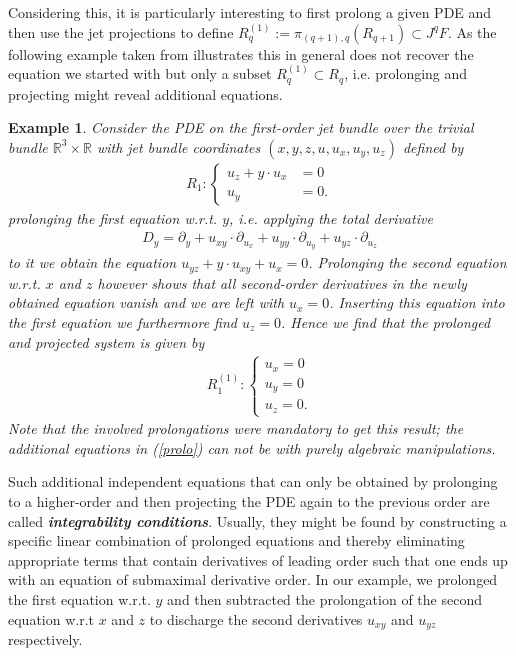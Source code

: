 \documentclass[a4paper,12pt, DIV=14, BCOR=5mm, twoside, headsepline, numbers=noenddot]{scrbook}
\newtheorem{example}{Example}[chapter]
\begin{document}
Considering this, it is particularly interesting to first prolong a given PDE and then use the jet projections to define $R_q^{(1)} := \pi_{(q+1),q}\left ( R_{q+1} \right ) \subset J^qF $. As the following example taken from \cite{seiler1994analysis} illustrates this in general does not recover the equation we started with but only a subset $R_q^{(1)} \subset R_q$, i.e. prolonging and projecting might reveal additional equations.
\begin{example}
Consider the PDE on the first-order jet bundle over the trivial bundle $\mathbb{R}^3 \times \mathbb{R}$ with jet bundle  coordinates $(x,y,z,u,u_x,u_y,u_z)$ defined by 
\begin{align}
    R_1 : \begin{cases} u_z + y \cdot u_x &= 0 \\
                        u_y &= 0.
            \end{cases}
\end{align}
prolonging the first equation w.r.t. $y$, i.e. applying the total derivative 
\begin{align}
D_y = \partial_y + u_{xy} \cdot \partial_{u_x} + u_{yy} \cdot \partial_{u_y} + u_{yz} \cdot \partial_{u_z}
\end{align}
to it we obtain the equation $u_{yz} + y \cdot u_{xy} + u_x =0$. Prolonging the second equation w.r.t. $x$ and $z$ however shows that all second-order derivatives in the newly obtained equation vanish and we are left with $u_x = 0$. Inserting this equation into the first equation we furthermore find $u_z = 0$. Hence we find that the prolonged and projected system is given by 
\begin{align}\label{prolo}
    R_1^{(1)} : \begin{cases} u_x = 0 \\
                        u_y = 0\\
                        u_z = 0 .
            \end{cases}
\end{align}
Note that the involved prolongations were mandatory to get this result; the additional equations in (\ref{prolo})  can not be with purely algebraic manipulations. 
\end{example}
Such additional independent equations that can only be obtained by prolonging to a higher-order and then projecting the PDE again to the previous order are called \textit{\textbf{integrability conditions}}. 
Usually, they might be found by constructing a specific linear combination of prolonged equations and thereby eliminating appropriate terms that contain derivatives of leading order such that one ends up with an equation of submaximal derivative order. In our example, we prolonged the first equation w.r.t. $y$ and then subtracted the prolongation of the second equation w.r.t $x$ and $z$ to discharge the second derivatives $u_{xy}$ and $u_{yz}$ respectively. 
\end{document}
